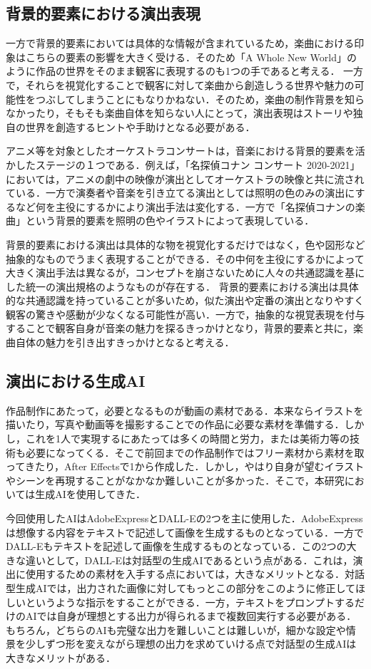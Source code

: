 \subsection{背景的要素における演出表現}
一方で背景的要素においては具体的な情報が含まれているため，楽曲における印象はこちらの要素の影響を大きく受ける．そのため「A Whole New World」のように作品の世界をそのまま観客に表現するのも1つの手であると考える．
一方で，それらを視覚化することで観客に対して楽曲から創造しうる世界や魅力の可能性をつぶしてしまうことにもなりかねない．そのため，楽曲の制作背景を知らなかったり，そもそも楽曲自体を知らない人にとって，演出表現はストーリや独自の世界を創造するヒントや手助けとなる必要がある．

アニメ等を対象としたオーケストラコンサートは，音楽における背景的要素を活かしたステージの１つである．例えば，「名探偵コナン コンサート 2020-2021」\cite{[anime]MingTanZhenkonanGongShiDetectiveConanConcert2021}においては，アニメの劇中の映像が演出としてオーケストラの映像と共に流されている．一方で演奏者や音楽を引き立てる演出としては照明の色のみの演出にするなど何を主役にするかにより演出手法は変化する．一方で「名探偵コナンの楽曲」という背景的要素を照明の色やイラストによって表現している．

背景的要素における演出は具体的な物を視覚化するだけではなく，色や図形など抽象的なものでうまく表現することができる．その中何を主役にするかによって大きく演出手法は異なるが，コンセプトを崩さないために人々の共通認識を基にした統一の演出規格のようなものが存在する．
背景的要素における演出は具体的な共通認識を持っていることが多いため，似た演出や定番の演出となりやすく観客の驚きや感動が少なくなる可能性が高い．一方で，抽象的な視覚表現を付与することで観客自身が音楽の魅力を探るきっかけとなり，背景的要素と共に，楽曲自体の魅力を引き出すきっかけとなると考える．


\subsection{演出における生成AI}
作品制作にあたって，必要となるものが動画の素材である．本来ならイラストを描いたり，写真や動画等を撮影することでの作品に必要な素材を準備する．しかし，これを1人で実現するにあたっては多くの時間と労力，または美術力等の技術も必要になってくる．そこで前回までの作品制作ではフリー素材から素材を取ってきたり，After Effectsで1から作成した．しかし，やはり自身が望むイラストやシーンを再現することがなかなか難しいことが多かった．そこで，本研究においては生成AIを使用してきた．

今回使用したAIはAdobeExpress\cite{adobeEX}とDALL-Eの2つを主に使用した．AdobeExpressは想像する内容をテキストで記述して画像を生成するものとなっている．一方でDALL-Eもテキストを記述して画像を生成するものとなっている．この2つの大きな違いとして，DALL-Eは対話型の生成AIであるという点がある．これは，演出に使用するための素材を入手する点においては，大きなメリットとなる．対話型生成AIでは，出力された画像に対してもっとこの部分をこのように修正してほしいというような指示をすることができる．一方，テキストをプロンプトするだけのAIでは自身が理想とする出力が得られるまで複数回実行する必要がある．もちろん，どちらのAIも完璧な出力を難しいことは難しいが，細かな設定や情景を少しずつ形を変えながら理想の出力を求めていける点で対話型の生成AIは大きなメリットがある．

